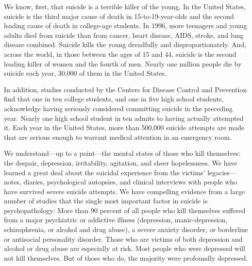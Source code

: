 \documentclass[11pt]{article}
\begin{document}
We know, ﬁrst, that suicide is a terrible killer of the young. In the United States, suicide is the third major cause of death in 15-to-19-year-olds and the second leading cause of death in college-age students. In 1996, more teenagers and young adults died from suicide than from cancer, heart disease, AIDS, stroke, and lung disease combined. Suicide kills the young dreadfully and disproportionately. And, across the world, in those between the ages of 15 and 44, suicide is the second leading killer of women and the fourth of men. Nearly one million people die by suicide each year, 30,000 of them in the United States.

In addition, studies conducted by the Centers for Disease Control and Prevention ﬁnd that one in ten college students, and one in ﬁve high school students, acknowledge having seriously considered committing suicide in the preceding year. Nearly one high school student in ten admits to having actually attempted it. Each year in the United States, more than 500,000 suicide attempts are made that are serious enough to warrant medical attention in an emergency room.

We understand—up to a point—the mental states of those who kill themselves: the despair, depression, irritability, agitation, and sheer hopelessness. We have learned a great deal about the suicidal experience from the victims’ legacies—notes, diaries, psychological autopsies, and clinical interviews with people who have survived severe suicide attempts. We have compelling evidence from a large number of studies that the single most important factor in suicide is psychopathology: More than 90 percent of all people who kill themselves suffered from a major psychiatric or addictive illness (depression, manic-depression, schizophrenia, or alcohol and drug abuse), a severe anxiety disorder, or borderline or antisocial personality disorder. Those who are victims of both depression and alcohol or drug abuse are especially at risk. Most people who were depressed will not kill themselves. But of those who do, the majority were profoundly depressed.
\end{document}
